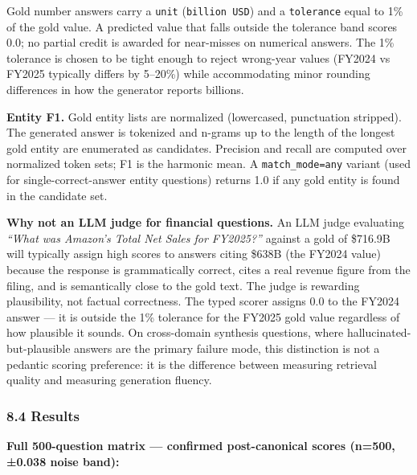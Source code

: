 Gold number answers carry a \texttt{unit} (\texttt{billion\ USD}) and a \texttt{tolerance} equal to 1\% of the gold value. A predicted value that falls outside the tolerance band scores 0.0; no partial credit is awarded for near-misses on numerical answers. The 1\% tolerance is chosen to be tight enough to reject wrong-year values (FY2024 vs FY2025 typically differs by 5--20\%) while accommodating minor rounding differences in how the generator reports billions.

\textbf{Entity F1.} Gold entity lists are normalized (lowercased, punctuation stripped). The generated answer is tokenized and n-grams up to the length of the longest gold entity are enumerated as candidates. Precision and recall are computed over normalized token sets; F1 is the harmonic mean. A \texttt{match\_mode=any} variant (used for single-correct-answer entity questions) returns 1.0 if any gold entity is found in the candidate set.

\textbf{Why not an LLM judge for financial questions.} An LLM judge evaluating \emph{``What was Amazon's Total Net Sales for FY2025?''} against a gold of \$716.9B will typically assign high scores to answers citing \$638B (the FY2024 value) because the response is grammatically correct, cites a real revenue figure from the filing, and is semantically close to the gold text. The judge is rewarding plausibility, not factual correctness. The typed scorer assigns 0.0 to the FY2024 answer --- it is outside the 1\% tolerance for the FY2025 gold value regardless of how plausible it sounds. On cross-domain synthesis questions, where hallucinated-but-plausible answers are the primary failure mode, this distinction is not a pedantic scoring preference: it is the difference between measuring retrieval quality and measuring generation fluency.

\subsubsection{8.4 Results}\label{results-1}

\textbf{Full 500-question matrix --- confirmed post-canonical scores (n=500, ±0.038 noise band):}

